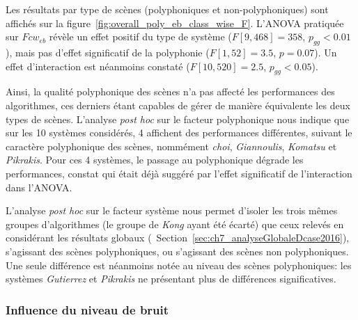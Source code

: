 Les résultats par type de scènes (polyphoniques et non-polyphoniques) sont affichés sur la figure~\ref{fig:overall_poly_eb_class_wise_F}. L'ANOVA pratiquée sur $Fcw_{eb}$ révèle un effet positif du type de système ($F[9,468]=358$, $p_{gg}<0.01$), mais pas d'effet significatif de la polyphonie ($F[1,52]=3.5$, $p=0.07$). Un effet d'interaction est néanmoins constaté ($F[10,520]=2.5$, $p_{gg}<0.05$).

Ainsi, la qualité polyphonique des scènes n'a pas affecté les performances des algorithmes, ces derniers étant capables de gérer de manière équivalente les deux types de scènes. L'analyse \emph{post hoc} sur le facteur polyphonique nous indique que sur les 10 systèmes considérés, 4 affichent des performances différentes, suivant le caractère polyphonique des scènes, nommément \emph{choi}, \emph{Giannoulis}, \emph{Komatsu} et \emph{Pikrakis}. Pour ces 4 systèmes, le passage au polyphonique dégrade les performances, constat qui était déjà suggéré par l'effet significatif de l'interaction dans l'ANOVA.

L'analyse \emph{post hoc} sur le facteur système nous permet d'isoler les trois mêmes groupes d'algorithmes (le groupe de \emph{Kong} ayant été écarté) que ceux relevés en considérant les résultats globaux (\cf~Section~\ref{sec:ch7_analyseGlobaleDcase2016}), s'agissant des scènes polyphoniques, ou s'agissant des scènes non polyphoniques. Une seule différence est néanmoins notée au niveau des scènes polyphoniques: les systèmes \emph{Gutierrez} et \emph{Pikrakis} ne présentant plus de différences significatives.

\subsubsection{Influence du niveau de bruit}

